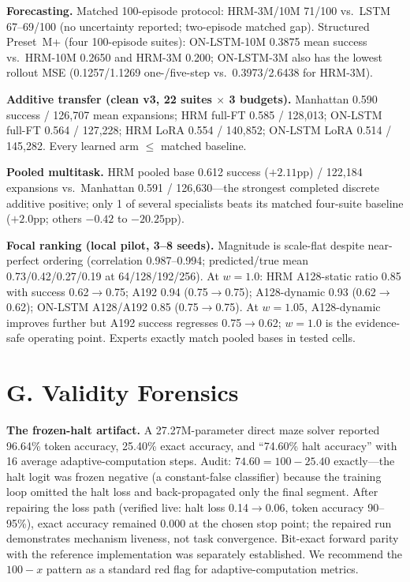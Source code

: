 \documentclass[letterpaper]{article} %
\begin{document}
\textbf{Forecasting.} Matched 100-episode protocol: HRM-3M/10M 71/100 vs.\ LSTM 67--69/100 (no uncertainty reported; two-episode matched gap). Structured Preset~M+ (four 100-episode suites): ON-LSTM-10M 0.3875 mean success vs.\ HRM-10M 0.2650 and HRM-3M 0.200; ON-LSTM-3M also has the lowest rollout MSE (0.1257/1.1269 one-/five-step vs.\ 0.3973/2.6438 for HRM-3M).

\textbf{Additive transfer (clean v3, 22 suites $\times$ 3 budgets).} Manhattan 0.590 success / 126{,}707 mean expansions; HRM full-FT 0.585 / 128{,}013; ON-LSTM full-FT 0.564 / 127{,}228; HRM LoRA 0.554 / 140{,}852; ON-LSTM LoRA 0.514 / 145{,}282. Every learned arm $\leq$ matched baseline.

\textbf{Pooled multitask.} HRM pooled base 0.612 success ($+2.11$pp) / 122{,}184 expansions vs.\ Manhattan 0.591 / 126{,}630---the strongest completed discrete additive positive; only 1 of several specialists beats its matched four-suite baseline ($+2.0$pp; others $-0.42$ to $-20.25$pp).

\textbf{Focal ranking (local pilot, 3--8 seeds).} Magnitude is scale-flat despite near-perfect ordering (correlation 0.987--0.994; predicted/true mean 0.73/0.42/0.27/0.19 at 64/128/192/256). At $w{=}1.0$: HRM A128-static ratio 0.85 with success 0.62$\to$0.75; A192 0.94 (0.75$\to$0.75); A128-dynamic 0.93 (0.62$\to$0.62); ON-LSTM A128/A192 0.85 (0.75$\to$0.75). At $w{=}1.05$, A128-dynamic improves further but A192 success regresses 0.75$\to$0.62; $w{=}1.0$ is the evidence-safe operating point. Experts exactly match pooled bases in tested cells.

\section{G. Validity Forensics}

\textbf{The frozen-halt artifact.} A 27.27M-parameter direct maze solver reported 96.64\% token accuracy, 25.40\% exact accuracy, and ``74.60\% halt accuracy'' with 16 average adaptive-computation steps. Audit: $74.60 = 100 - 25.40$ exactly---the halt logit was frozen negative (a constant-false classifier) because the training loop omitted the halt loss and back-propagated only the final segment. After repairing the loss path (verified live: halt loss 0.14$\to$0.06, token accuracy 90--95\%), exact accuracy remained 0.000 at the chosen stop point; the repaired run demonstrates mechanism liveness, not task convergence. Bit-exact forward parity with the reference implementation was separately established. We recommend the $100{-}x$ pattern as a standard red flag for adaptive-computation metrics.
\end{document}
